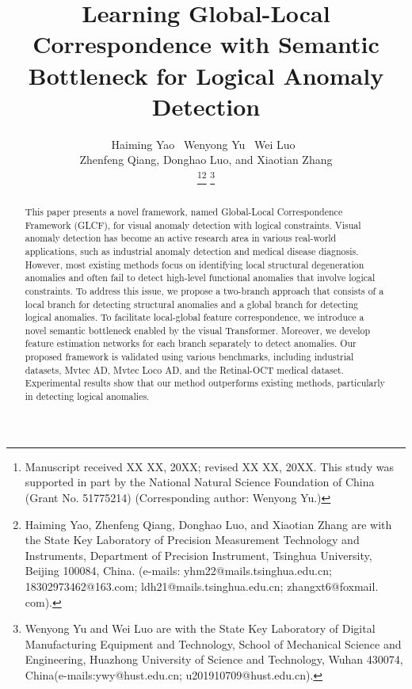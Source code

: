\documentclass[lettersize,journal]{IEEEtran}
\begin{document}
\title{Learning Global-Local Correspondence with Semantic Bottleneck for Logical Anomaly Detection}

\author{Haiming Yao~  Wenyong Yu~ Wei Luo~ \\
Zhenfeng Qiang, Donghao Luo, and Xiaotian Zhang

\thanks{Manuscript received XX XX, 20XX; revised XX XX, 20XX. This study was supported in part by the National Natural Science Foundation of China (Grant No. 51775214) (Corresponding author: Wenyong Yu.)}\thanks{Haiming Yao, Zhenfeng Qiang, Donghao Luo, and Xiaotian Zhang are with the State Key Laboratory of Precision Measurement Technology and Instruments, Department of Precision Instrument, Tsinghua University, Beijing 100084, China. (e-mails: yhm22@mails.tsinghua.edu.cn; 18302973462@163.com; ldh21@mails.tsinghua.edu.cn; zhangxt6@foxmail.\\ com).}
\thanks{Wenyong Yu and Wei Luo are with the State Key Laboratory of Digital Manufacturing Equipment and Technology, School of Mechanical Science and Engineering, Huazhong University of Science and Technology, Wuhan 430074, China(e-mails:ywy@hust.edu.cn; u201910709@hust.edu.cn).}}




\maketitle

\begin{abstract}
This paper presents a novel framework, named Global-Local Correspondence Framework (GLCF), for visual anomaly detection with logical constraints. Visual anomaly detection has become an active research area in various real-world applications, such as industrial anomaly detection and medical disease diagnosis. However, most existing methods focus on identifying local structural degeneration anomalies and often fail to detect high-level functional anomalies that involve logical constraints. To address this issue, we propose a two-branch approach that consists of a local branch for detecting structural anomalies and a global branch for detecting logical anomalies. To facilitate local-global feature correspondence, we introduce a novel semantic bottleneck enabled by the visual Transformer. Moreover, we develop feature estimation networks for each branch separately to detect anomalies. Our proposed framework is validated using various benchmarks, including industrial datasets, Mvtec AD, Mvtec Loco AD, and the Retinal-OCT medical dataset. Experimental results show that our method outperforms existing methods, particularly in detecting logical anomalies.
\end{abstract}
\end{document}
